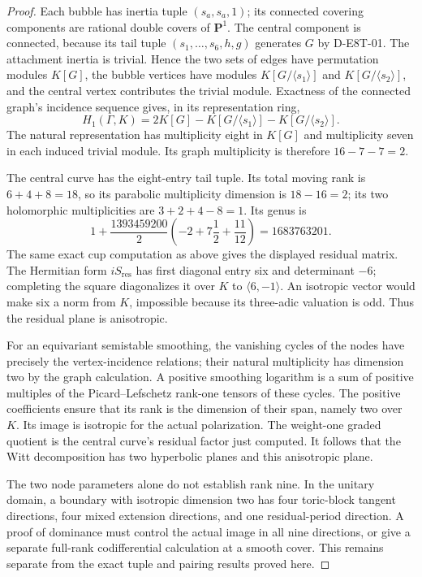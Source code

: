 \begin{proof}
Each bubble has inertia tuple $(s_a,s_a,1)$; its connected covering
components are rational double covers of $\mathbf P^1$. The central
component is connected, because its tail tuple
$(s_1,\ldots,s_6,h,g)$ generates $G$ by D-E8T-01. The attachment
inertia is trivial. Hence the two sets of edges have permutation
modules $K[G]$, the bubble vertices have modules
$K[G/\langle s_1\rangle]$ and $K[G/\langle s_2\rangle]$, and the
central vertex contributes the trivial module. Exactness of the
connected graph's incidence sequence gives, in its representation
ring,
\[
H_1(\Gamma,K)=2K[G]-K[G/\langle s_1\rangle]
                         -K[G/\langle s_2\rangle].
\]
The natural representation has multiplicity eight in $K[G]$ and
multiplicity seven in each induced trivial module. Its graph
multiplicity is therefore $16-7-7=2$.

The central curve has the eight-entry tail tuple. Its total moving
rank is $6+4+8=18$, so its parabolic multiplicity dimension is
$18-16=2$; its two holomorphic multiplicities are $3+2+4-8=1$.
Its genus is
\[
1+\frac{1393459200}{2}
 \left(-2+7\frac12+\frac{11}{12}\right)=1683763201.
\]
The same exact cup computation as above gives the displayed residual
matrix. The Hermitian form $iS_{\mathrm{res}}$ has first diagonal
entry six and determinant $-6$; completing the square diagonalizes
it over $K$ to $\langle6,-1\rangle$. An isotropic vector would make
six a norm from $K$, impossible because its three-adic valuation is
odd. Thus the residual plane is anisotropic.

For an equivariant semistable smoothing, the vanishing cycles of
the nodes have precisely the vertex-incidence relations; their
natural multiplicity has dimension two by the graph calculation.
A positive smoothing logarithm is a sum of positive multiples of
the Picard--Lefschetz rank-one tensors of these cycles. The positive
coefficients ensure that its rank is the dimension of their span,
namely two over $K$. Its image is isotropic for the actual
polarization. The weight-one graded quotient is the central
curve's residual factor just computed. It follows that the Witt
decomposition has two hyperbolic planes and this anisotropic plane.

The two node parameters alone do not establish rank nine. In the
unitary domain, a boundary with isotropic dimension two has four
toric-block tangent directions, four mixed extension directions,
and one residual-period direction. A proof of dominance must
control the actual image in all nine directions, or give a separate
full-rank codifferential calculation at a smooth cover. This remains
separate from the exact tuple and pairing results proved here.
\end{proof}
